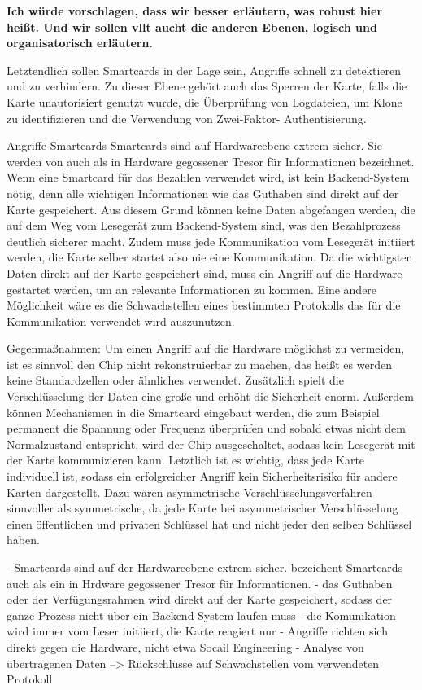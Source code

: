 \textbf{Ich würde vorschlagen, dass wir besser erläutern, was robust hier heißt. Und wir sollen vllt
aucht die anderen Ebenen, logisch und organisatorisch erläutern.}


Letztendlich sollen Smartcards in der Lage sein, Angriffe schnell zu detektieren und zu verhindern.
Zu dieser Ebene gehört auch das Sperren der Karte, falls die Karte unautorisiert genutzt wurde, 
die Überprüfung von Logdateien, um Klone zu identifizieren und die Verwendung von Zwei-Faktor-
Authentisierung.


Angriffe Smartcards
Smartcards sind auf Hardwareebene extrem sicher. Sie werden von \cite{refmas:ASSS} 
auch als in Hardware gegossener Tresor für Informationen bezeichnet. Wenn eine Smartcard für das Bezahlen verwendet wird,
ist kein Backend-System nötig, denn alle wichtigen Informationen wie das Guthaben sind direkt auf der Karte gespeichert. Aus diesem Grund 
können keine Daten abgefangen werden, die auf dem Weg vom Lesegerät zum Backend-System sind, was den Bezahlprozess deutlich sicherer macht.
Zudem muss jede Kommunikation vom Lesegerät initiiert werden, die Karte selber startet also nie eine Kommunikation. Da die wichtigsten Daten
direkt auf der Karte gespeichert sind, muss ein Angriff auf die Hardware gestartet werden, um an relevante Informationen zu kommen.
Eine andere Möglichkeit wäre es die Schwachstellen eines bestimmten Protokolls das für die Kommunikation verwendet wird auszunutzen.

Gegenmaßnahmen:
Um einen Angriff auf die Hardware möglichst zu vermeiden, ist es sinnvoll den Chip nicht rekonstruierbar zu machen,
das heißt es werden keine Standardzellen oder ähnliches verwendet.
Zusätzlich spielt die Verschlüsselung der Daten eine große und erhöht die Sicherheit enorm.
Außerdem können Mechanismen in die Smartcard eingebaut werden, die zum Beispiel permanent die Spannung oder Frequenz
überprüfen und sobald etwas nicht dem Normalzustand entspricht, wird der Chip ausgeschaltet, sodass kein Lesegerät mit der 
Karte kommunizieren kann. Letztlich ist es wichtig, dass jede Karte individuell ist, sodass ein erfolgreicher Angriff kein 
Sicherheitsrisiko für andere Karten dargestellt. Dazu wären asymmetrische Verschlüsselungsverfahren sinnvoller als 
symmetrische, da jede Karte bei asymmetrischer Verschlüsselung einen öffentlichen und privaten Schlüssel hat und nicht jeder den selben 
Schlüssel haben.




- Smartcards sind auf der Hardwareebene extrem sicher. \cite{refmas:ASSS}  bezeichent Smartcards auch als 
  ein in Hrdware gegossener Tresor für Informationen. 
- das Guthaben oder der Verfügungsrahmen wird direkt auf der Karte gespeichert, sodass der ganze Prozess nicht über ein Backend-System laufen muss
- die Komunikation wird immer vom Leser initiiert, die Karte reagiert nur
- Angriffe richten sich direkt gegen die Hardware, nicht etwa Socail Engineering 
- Analyse von übertragenen Daten --> Rückschlüsse auf Schwachstellen vom verwendeten Protokoll

